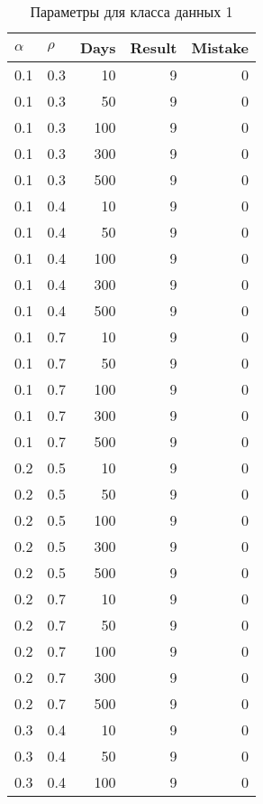 \begin{center}
	\captionsetup{justification=raggedright,singlelinecheck=off}
	\begin{longtable}[c]{|r|r|r|r|r|}
		\caption{Параметры для класса данных 1 \label{tbl:cls1}}\\ \hline
		\multicolumn{1}{|l|}{$\alpha$} &
		\multicolumn{1}{l|}{$\rho$} & 
		\multicolumn{1}{l|}{Days} & 
		\multicolumn{1}{l|}{Result} & 
		\multicolumn{1}{l|}{Mistake} \\ \hline
		0.1 & 0.3 &  10 &    9 &    0 \\
		0.1 & 0.3 &  50 &    9 &    0 \\
		0.1 & 0.3 & 100 &    9 &    0 \\
		0.1 & 0.3 & 300 &    9 &    0 \\
		0.1 & 0.3 & 500 &    9 &    0 \\ \hline
		0.1 & 0.4 &  10 &    9 &    0 \\
		0.1 & 0.4 &  50 &    9 &    0 \\
		0.1 & 0.4 & 100 &    9 &    0 \\
		0.1 & 0.4 & 300 &    9 &    0 \\
		0.1 & 0.4 & 500 &    9 &    0 \\ \hline
		0.1 & 0.7 &  10 &    9 &    0 \\
		0.1 & 0.7 &  50 &    9 &    0 \\
		0.1 & 0.7 & 100 &    9 &    0 \\
		0.1 & 0.7 & 300 &    9 &    0 \\
		0.1 & 0.7 & 500 &    9 &    0 \\ \hline
		0.2 & 0.5 &  10 &    9 &    0 \\
		0.2 & 0.5 &  50 &    9 &    0 \\
		0.2 & 0.5 & 100 &    9 &    0 \\
		0.2 & 0.5 & 300 &    9 &    0 \\
		0.2 & 0.5 & 500 &    9 &    0 \\ \hline
		0.2 & 0.7 &  10 &    9 &    0 \\
		0.2 & 0.7 &  50 &    9 &    0 \\
		0.2 & 0.7 & 100 &    9 &    0 \\
		0.2 & 0.7 & 300 &    9 &    0 \\
		0.2 & 0.7 & 500 &    9 &    0 \\ \hline
		0.3 & 0.4 &  10 &    9 &    0 \\
		0.3 & 0.4 &  50 &    9 &    0 \\
		0.3 & 0.4 & 100 &    9 &    0 \\

\end{longtable}
\end{center}
